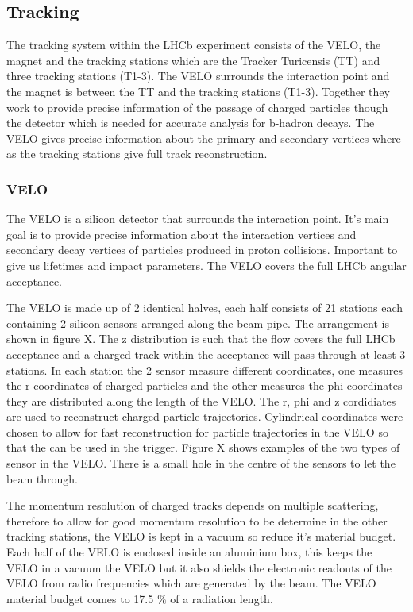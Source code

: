 \subsection{Tracking}


The tracking system within the LHCb experiment consists of the VELO, the magnet and the tracking stations which are the Tracker Turicensis (TT) and three tracking stations (T1-3). The VELO surrounds the interaction point and the magnet is between the TT and the tracking stations (T1-3). Together they work to provide precise information of the passage of charged particles though the detector which is needed for accurate analysis for b-hadron decays. The VELO gives precise information about the primary and secondary vertices where as the tracking stations give full track reconstruction. 

\subsubsection{VELO}
The VELO is a silicon detector that surrounds the interaction point. It’s main goal is to provide precise information about the interaction vertices and secondary decay vertices of particles produced in proton collisions. Important to give us lifetimes and impact parameters. The VELO covers the full LHCb angular acceptance.

The VELO is made up of 2 identical halves, each half consists of 21 stations each containing 2 silicon sensors arranged along the beam pipe. The arrangement is shown in figure X. The z distribution is such that the flow covers the full LHCb acceptance and a charged track within the acceptance will pass through at least 3 stations. In each station the 2 sensor measure different coordinates, one measures the r coordinates of charged particles and the other measures the phi coordinates they are distributed along the length of the VELO. The r, phi and z cordidiates are used to reconstruct charged particle trajectories. Cylindrical coordinates were chosen to allow for fast reconstruction for particle trajectories in the VELO so that the can be used in the trigger. Figure X shows examples of the two types of sensor in the VELO. There is a small hole in the centre of the sensors to let the beam through.

The momentum resolution of charged tracks depends on multiple scattering, therefore to allow for good momentum resolution to be determine in the other tracking stations, the VELO is kept in a vacuum so reduce it’s material budget. Each half of the VELO is enclosed inside an aluminium box, this keeps the VELO in a  vacuum the VELO but it also shields the electronic readouts of the VELO from radio frequencies which are generated by the beam. The VELO material budget comes to 17.5 $\%$ of a radiation length.

